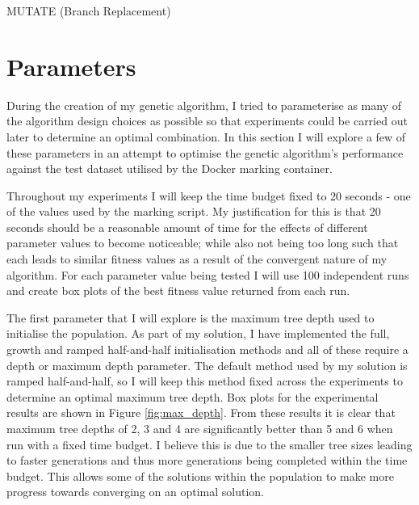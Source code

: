 \documentclass[11pt]{article}
\begin{document}
\begin{algorithm}[ht]
  \caption{MUTATE (Branch Replacement)}
  \label{alg:mut}
  \DontPrintSemicolon
\end{algorithm}

\section{Parameters}

During the creation of my genetic algorithm, I tried to parameterise as many of the algorithm design choices as possible so that experiments could be carried out later to determine an optimal combination.
In this section I will explore a few of these parameters in an attempt to optimise the genetic algorithm's performance against the test dataset utilised by the Docker marking container.

Throughout my experiments I will keep the time budget fixed to 20 seconds - one of the values used by the marking script.
My justification for this is that 20 seconds should be a reasonable amount of time for the effects of different parameter values to become noticeable; while also not being too long such that each leads to similar fitness values as a result of the convergent nature of my algorithm.
For each parameter value being tested I will use 100 independent runs and create box plots of the best fitness value returned from each run.

The first parameter that I will explore is the maximum tree depth used to initialise the population.
As part of my solution, I have implemented the full, growth and ramped half-and-half initialisation methods and all of these require a depth or maximum depth parameter.
The default method used by my solution is ramped half-and-half, so I will keep this method fixed across the experiments to determine an optimal maximum tree depth.
Box plots for the experimental results are shown in Figure \ref{fig:max_depth}.
From these results it is clear that maximum tree depths of 2, 3 and 4 are significantly better than 5 and 6 when run with a fixed time budget.
I believe this is due to the smaller tree sizes leading to faster generations and thus more generations being completed within the time budget.
This allows some of the solutions within the population to make more progress towards converging on an optimal solution.
\end{document}
